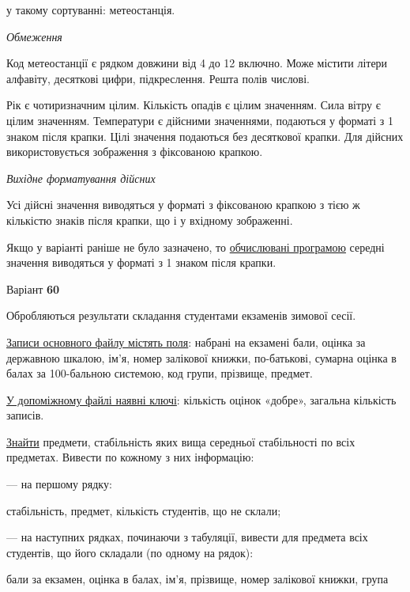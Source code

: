 \documentclass[11pt, ukrainian]{article}
\begin{document}
{\noindent}у такому сортуванні: метеостанція.


\bigskip\textit{Обмеження}

Код метеостанції є рядком довжини від 4 до 12 включно.
Може містити літери алфавіту, десяткові цифри, підкреслення. Решта полів числові.

Рік є чотиризначним цілим.
Кількість опадів є цілим значенням.
Сила вітру є цілим значенням.
Температури є дійсними значеннями, подаються у форматі з 1 знаком після крапки.
Цілі значення подаються без десяткової крапки.
Для дійсних використовується зображення з фіксованою крапкою.

\textit{Вихідне форматування дійсних}

Усі дійсні значення виводяться у форматі з фіксованою крапкою з тією ж кількістю знаків після крапки, що і у вхідному зображенні.

Якщо у варіанті раніше не було зазначено, то \underline{обчислювані програмою} середні значення виводяться у форматі з 1 знаком після крапки.




\par
\newpage
{\center Варіант  \No \textbf { 60 }\par}
\bigskip
Обробляються результати складання студентами екзаменів зимової сесії.

\underline{Записи основного файлу містять поля}: набрані на екзамені бали, оцінка за державною шкалою, ім’я, номер залікової книжки, по-батькові, сумарна оцінка в балах за 100-бальною системою, код групи, прізвище, предмет.

\underline{У допоміжному файлі наявні ключі}: кількість оцінок «добре», загальна кількість записів.

\underline{Знайти} предмети, стабільність яких вища середньої стабільності по всіх предметах. Вивести по кожному з них інформацію:\par
{\noindent}--- на першому рядку:\par
стабільність, предмет, кількість студентів, що не склали;

{\noindent}--- на наступних рядках, починаючи з табуляції, вивести для предмета всіх студентів, що його складали (по одному на рядок):\par
бали за екзамен, оцінка в балах, ім’я, прізвище, номер залікової книжки, група
\end{document}
